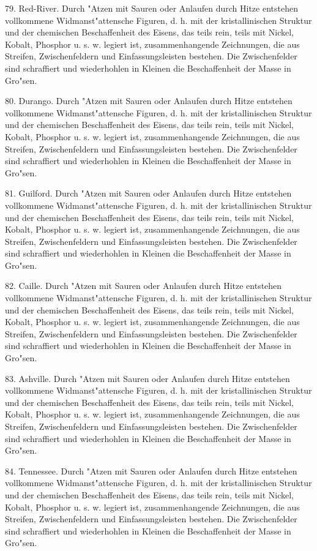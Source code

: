 \documentclass[a4paper, 11pt, oneside, polutonikogreek, german]{article}
\begin{document}
79. Red-River. Durch "Atzen mit Sauren oder Anlaufen durch Hitze entstehen vollkommene Widmanst"attensche Figuren, d. h. mit der kristallinischen Struktur und der chemischen Beschaffenheit des Eisens, das teils rein, teils mit Nickel, Kobalt, Phosphor u. s. w. legiert ist, zusammenhangende Zeichnungen, die aus Streifen, Zwischenfeldern und Einfassungsleisten bestehen. Die Zwischenfelder sind schraffiert und wiederhohlen in Kleinen die Beschaffenheit der Masse in Gro"sen.

80. Durango. Durch "Atzen mit Sauren oder Anlaufen durch Hitze entstehen vollkommene Widmanst"attensche Figuren, d. h. mit der kristallinischen Struktur und der chemischen Beschaffenheit des Eisens, das teils rein, teils mit Nickel, Kobalt, Phosphor u. s. w. legiert ist, zusammenhangende Zeichnungen, die aus Streifen, Zwischenfeldern und Einfassungsleisten bestehen. Die Zwischenfelder sind schraffiert und wiederhohlen in Kleinen die Beschaffenheit der Masse in Gro"sen.

81. Guilford. Durch "Atzen mit Sauren oder Anlaufen durch Hitze entstehen vollkommene Widmanst"attensche Figuren, d. h. mit der kristallinischen Struktur und der chemischen Beschaffenheit des Eisens, das teils rein, teils mit Nickel, Kobalt, Phosphor u. s. w. legiert ist, zusammenhangende Zeichnungen, die aus Streifen, Zwischenfeldern und Einfassungsleisten bestehen. Die Zwischenfelder sind schraffiert und wiederhohlen in Kleinen die Beschaffenheit der Masse in Gro"sen.

82. Caille. Durch "Atzen mit Sauren oder Anlaufen durch Hitze entstehen vollkommene Widmanst"attensche Figuren, d. h. mit der kristallinischen Struktur und der chemischen Beschaffenheit des Eisens, das teils rein, teils mit Nickel, Kobalt, Phosphor u. s. w. legiert ist, zusammenhangende Zeichnungen, die aus Streifen, Zwischenfeldern und Einfassungsleisten bestehen. Die Zwischenfelder sind schraffiert und wiederhohlen in Kleinen die Beschaffenheit der Masse in Gro"sen.

83. Ashville. Durch "Atzen mit Sauren oder Anlaufen durch Hitze entstehen vollkommene Widmanst"attensche Figuren, d. h. mit der kristallinischen Struktur und der chemischen Beschaffenheit des Eisens, das teils rein, teils mit Nickel, Kobalt, Phosphor u. s. w. legiert ist, zusammenhangende Zeichnungen, die aus Streifen, Zwischenfeldern und Einfassungsleisten bestehen. Die Zwischenfelder sind schraffiert und wiederhohlen in Kleinen die Beschaffenheit der Masse in Gro"sen.

84. Tennessee. Durch "Atzen mit Sauren oder Anlaufen durch Hitze entstehen vollkommene Widmanst"attensche Figuren, d. h. mit der kristallinischen Struktur und der chemischen Beschaffenheit des Eisens, das teils rein, teils mit Nickel, Kobalt, Phosphor u. s. w. legiert ist, zusammenhangende Zeichnungen, die aus Streifen, Zwischenfeldern und Einfassungsleisten bestehen. Die Zwischenfelder sind schraffiert und wiederhohlen in Kleinen die Beschaffenheit der Masse in Gro"sen.
\end{document}
